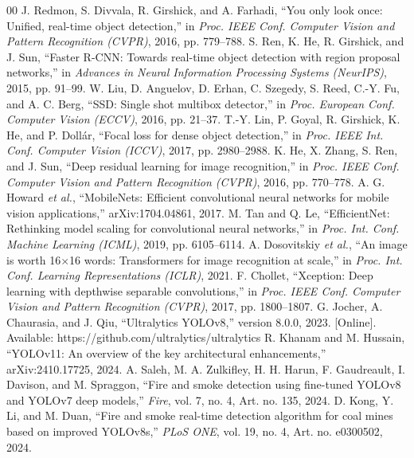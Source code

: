 \documentclass[conference]{IEEEtran}
\begin{document}
\begin{thebibliography}{00}
 J. Redmon, S. Divvala, R. Girshick, and A. Farhadi, ``You only look once: Unified, real-time object detection,'' in \textit{Proc. IEEE Conf. Computer Vision and Pattern Recognition (CVPR)}, 2016, pp. 779--788.
 S. Ren, K. He, R. Girshick, and J. Sun, ``Faster R-CNN: Towards real-time object detection with region proposal networks,'' in \textit{Advances in Neural Information Processing Systems (NeurIPS)}, 2015, pp. 91--99.
 W. Liu, D. Anguelov, D. Erhan, C. Szegedy, S. Reed, C.-Y. Fu, and A. C. Berg, ``SSD: Single shot multibox detector,'' in \textit{Proc. European Conf. Computer Vision (ECCV)}, 2016, pp. 21--37.
 T.-Y. Lin, P. Goyal, R. Girshick, K. He, and P. Doll\'ar, ``Focal loss for dense object detection,'' in \textit{Proc. IEEE Int. Conf. Computer Vision (ICCV)}, 2017, pp. 2980--2988.
 K. He, X. Zhang, S. Ren, and J. Sun, ``Deep residual learning for image recognition,'' in \textit{Proc. IEEE Conf. Computer Vision and Pattern Recognition (CVPR)}, 2016, pp. 770--778.
 A. G. Howard \textit{et al.}, ``MobileNets: Efficient convolutional neural networks for mobile vision applications,'' arXiv:1704.04861, 2017.
 M. Tan and Q. Le, ``EfficientNet: Rethinking model scaling for convolutional neural networks,'' in \textit{Proc. Int. Conf. Machine Learning (ICML)}, 2019, pp. 6105--6114.
 A. Dosovitskiy \textit{et al.}, ``An image is worth 16$\times$16 words: Transformers for image recognition at scale,'' in \textit{Proc. Int. Conf. Learning Representations (ICLR)}, 2021.
 F. Chollet, ``Xception: Deep learning with depthwise separable convolutions,'' in \textit{Proc. IEEE Conf. Computer Vision and Pattern Recognition (CVPR)}, 2017, pp. 1800--1807.
 G. Jocher, A. Chaurasia, and J. Qiu, ``Ultralytics YOLOv8,'' version 8.0.0, 2023. [Online]. Available: https://github.com/ultralytics/ultralytics
 R. Khanam and M. Hussain, ``YOLOv11: An overview of the key architectural enhancements,'' arXiv:2410.17725, 2024.
 A. Saleh, M. A. Zulkifley, H. H. Harun, F. Gaudreault, I. Davison, and M. Spraggon, ``Fire and smoke detection using fine-tuned YOLOv8 and YOLOv7 deep models,'' \textit{Fire}, vol. 7, no. 4, Art. no. 135, 2024.
 D. Kong, Y. Li, and M. Duan, ``Fire and smoke real-time detection algorithm for coal mines based on improved YOLOv8s,'' \textit{PLoS ONE}, vol. 19, no. 4, Art. no. e0300502, 2024.

\end{thebibliography}
\end{document}
